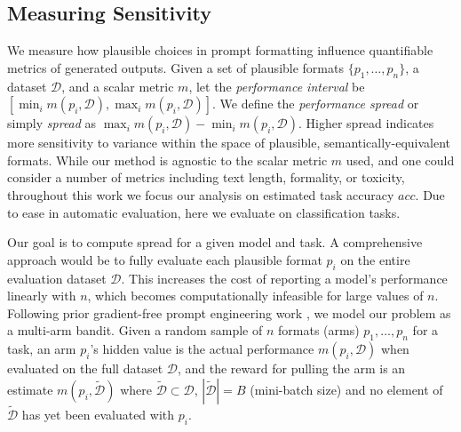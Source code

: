 \documentclass{article} %
\begin{document}
\subsection{Measuring Sensitivity}\label{sec:proposed_solution}

We measure how plausible choices in prompt formatting influence quantifiable metrics of generated outputs.
Given a set of plausible formats $\{p_1,\ldots,p_n\}$, a dataset $\mathcal{D}$, and a scalar metric $m$, let the \textit{performance interval} be $[\min_i m(p_i, \mathcal{D}), \max_i m(p_i, \mathcal{D})]$. %
We define the \textit{performance spread} or simply \textit{spread} as $\max_i m(p_i, \mathcal{D})-\min_i m(p_i, \mathcal{D})$.
Higher spread indicates more sensitivity to variance within the space of plausible, semantically-equivalent formats.
While our method is agnostic to the scalar metric $m$ used, and one could consider a number of metrics including text length, formality, or toxicity, throughout this work we focus our analysis on estimated task accuracy $acc$. %
Due to ease in automatic evaluation, here we evaluate on classification tasks.

Our goal is to compute spread for a given model and task. A comprehensive approach would be to fully evaluate each plausible format $p_i$ on the entire evaluation dataset $\mathcal{D}$. This increases the cost of reporting a model's performance linearly with $n$, which becomes computationally infeasible for large values of $n$.
Following prior gradient-free prompt engineering work \citep{zhou2022large, pryzant2023automatic}, we model our problem as a multi-arm bandit. 
Given a random sample of $n$ formats (arms) $p_1,\ldots, p_n$ for a task, an arm $p_i$'s hidden value is the actual performance $m(p_i, \mathcal{D})$ when evaluated on the full dataset $\mathcal{D}$, and the reward for pulling the arm is an estimate $m(p_i, \mathcal{\tilde{D}})$ where $\mathcal{\tilde{D}}\subset \mathcal{D}$, $|\mathcal{\tilde{D}}| = B$ (mini-batch size) and no element of $\mathcal{\tilde{D}}$ has yet been evaluated with $p_i$.
\end{document}
